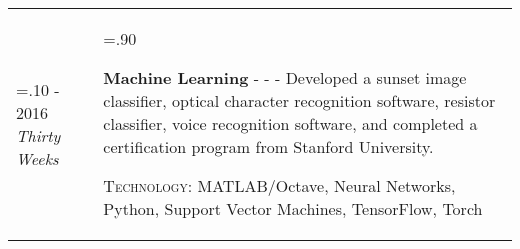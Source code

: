 \documentclass[10pt]{article}
\newcommand{\timeFrame}[3] {
  \if\relax\detokenize{#2}\relax
    #1
  \else
    #1 - #2
  \fi
  \newline
  \scriptsize \textit{#3}
}
\newcommand{\entry}[5] {
  \textbf{#1}
  \if\relax\detokenize{#2}\relax
  \else
       - \textsc{#2}
  \fi
  \if\relax\detokenize{#3}\relax
  \else
      - \textsc{#3}
  \fi
  \newline #4
  \if\relax\detokenize{#5}\relax
  \else
      \newline \textsc{Technology:} #5
  \fi
  \\
}
\begin{document}
\begin{tabularx}{\linewidth}{>{\hsize=.10\hsize}X>{\hsize=.90\hsize}X}
\timeFrame{2015}{2016}{Thirty Weeks} &
\entry{Machine Learning}
  {}
  {}
  {
  - Developed a sunset image classifier, optical character recognition software, resistor classifier, voice recognition software, and completed a certification program from Stanford University.
  }
  {MATLAB/Octave, Neural Networks, Python, Support Vector Machines, TensorFlow, Torch}











\end{tabularx}
\end{document}
